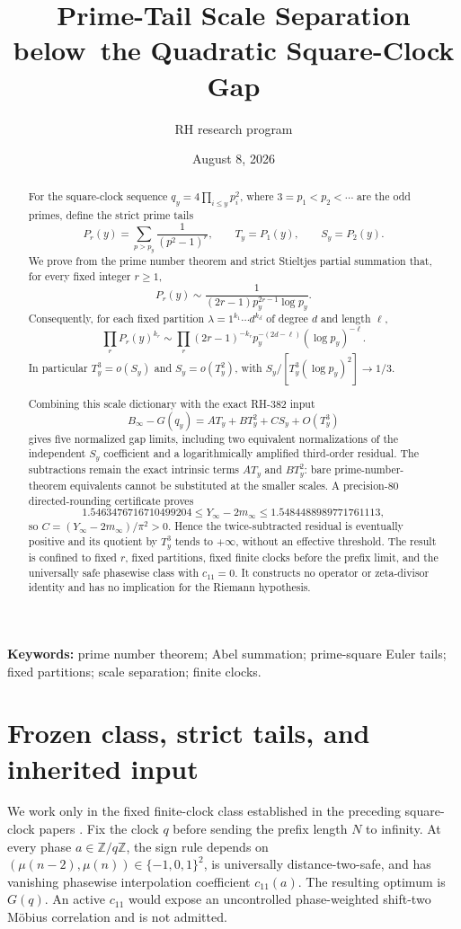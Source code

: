 \documentclass[11pt]{article}
\title{Prime-Tail Scale Separation below\
the Quadratic Square-Clock Gap}
\author{RH research program}
\date{August 8, 2026}
\theoremstyle{definition}
\theoremstyle{remark}
\newcommand{\mob}{\mu}
\newcommand{\Z}{\mathbb Z}
\begin{document}
\maketitle

\begin{abstract}
For the square-clock sequence
$q_y=4\prod_{i\le y}p_i^2$, where $3=p_1<p_2<\cdots$ are the odd
primes, define the strict prime tails
\[
 P_r(y)=\sum_{p>p_y}\frac{1}{(p^2-1)^r},\qquad
 T_y=P_1(y),\qquad S_y=P_2(y).
\]
We prove from the prime number theorem and strict Stieltjes partial
summation that, for every fixed integer $r\ge1$,
\[
 P_r(y)\sim\frac{1}{(2r-1)p_y^{2r-1}\log p_y}.
\]
Consequently, for each fixed partition
$\lambda=1^{k_1}\cdots d^{k_d}$ of degree $d$ and length $\ell$,
\[
 \prod_rP_r(y)^{k_r}
 \sim\prod_r(2r-1)^{-k_r}
 p_y^{-(2d-\ell)}(\log p_y)^{-\ell}.
\]
In particular $T_y^3=o(S_y)$ and $S_y=o(T_y^2)$, with
$S_y/[T_y^3(\log p_y)^2]\to1/3$.

Combining this scale dictionary with the exact RH-382 input
\[
 B_\infty-G(q_y)=A T_y+B T_y^2+C S_y+O(T_y^3)
\]
gives five normalized gap limits, including two equivalent normalizations
of the independent $S_y$ coefficient and a logarithmically amplified
third-order residual.  The subtractions remain the exact intrinsic terms
$A T_y$ and $B T_y^2$: bare prime-number-theorem equivalents cannot be
substituted at the smaller scales.  A precision-$80$ directed-rounding
certificate proves
\[
 1.5463476716710499204
 \le Y_\infty-2m_\infty
 \le1.5484488989771761113,
\]
so $C=(Y_\infty-2m_\infty)/\pi^2>0$.  Hence the twice-subtracted residual
is eventually positive and its quotient by $T_y^3$ tends to $+\infty$,
without an effective threshold.  The result is confined to fixed $r$,
fixed partitions, fixed finite clocks before the prefix limit, and the
universally safe phasewise class with $c_{11}=0$.  It constructs no
operator or zeta-divisor identity and has no implication for the Riemann
hypothesis.
\end{abstract}

\noindent\textbf{Keywords:} prime number theorem; Abel summation;
prime-square Euler tails; fixed partitions; scale separation; finite
clocks.

\section{Frozen class, strict tails, and inherited input}

We work only in the fixed finite-clock class established in the preceding
square-clock papers \citep{RH374,RH379,RH380,RH381,RH382,RH383}.  Fix the
clock $q$ before sending the prefix length $N$ to infinity.  At every phase
$a\in\Z/q\Z$, the sign rule depends on
$(\mob(n-2),\mob(n))\in\{-1,0,1\}^2$, is universally distance-two-safe,
and has vanishing phasewise interpolation coefficient $c_{11}(a)$.  The
resulting optimum is $G(q)$.  An active $c_{11}$ would expose an uncontrolled
phase-weighted shift-two M\"obius correlation and is not admitted.
\end{document}
